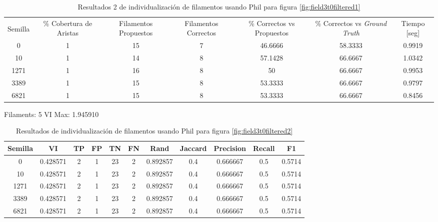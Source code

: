 \begin{table}[h]
    \centering
    \begin{tabular}{|c|c|c|c|c|c|c|}
    \hline
         & \multirow{4}{2cm}{\centering \% Cobertura de Aristas} & \multirow{4}{2cm}{Filamentos Propuestos} & \multirow{4}{2cm}{Filamentos Correctos} & \multirow{4}{2.5cm}{\% Correctos vs Propuestos} & \multirow{4}{2.5cm}{\centering \% Correctos vs {\it Ground Truth}} & \multirow{4}{1.2cm}{\centering Tiempo [seg]} \\
         &  &  &  & & &  \\
        Semilla &  &  &  & & &  \\
        &  &  &  & & &  \\ \hline 
        0 & 1 & 15 & 7 & 46.6666 & 58.3333 & 0.9919  \\
        10 & 1 & 14 & 8 & 57.1428 & 66.6667 & 1.0342\\
        1271 & 1 & 16 & 8 & 50  & 66.6667 & 0.9953\\
        3389 & 1 & 15 & 8 & 53.3333 & 66.6667 & 0.9797\\
        6821 & 1 & 15 & 8 & 53.3333 & 66.6667 & 0.8456\\
        \hline
    \end{tabular}
    \caption{Resultados 2 de individualizaci\'on de filamentos usando Phil para figura \ref{fig:field3t0filtered1}}
    \label{tab:field3t0filtered1Results2}
\end{table}

Filaments: 5	VI Max: 1.945910
\begin{table}[h]
    \centering
    \begin{tabular}{|c|c|c|c|c|c|c|c|c|c|c|}
    \hline
        Semilla & VI & TP & FP &TN &FN & Rand	& Jaccard &	Precision &	Recall &	F1 \\ \hline 
        0    & 0.428571 & 2 & 1 & 23 & 2 & 0.892857 & 0.4 & 0.666667 & 0.5 & 0.5714 \\
        10   & 0.428571 & 2 & 1 & 23 & 2 & 0.892857 & 0.4 & 0.666667 & 0.5 & 0.5714 \\
        1271 & 0.428571 & 2 & 1 & 23 & 2 & 0.892857 & 0.4 & 0.666667 & 0.5 & 0.5714 \\
        3389 & 0.428571 & 2 & 1 & 23 & 2 & 0.892857 & 0.4 & 0.666667 & 0.5 & 0.5714 \\
        6821 & 0.428571 & 2 & 1 & 23 & 2 & 0.892857 & 0.4 & 0.666667 & 0.5 & 0.5714 \\
        \hline
    \end{tabular}
    \caption{Resultados de individualizaci\'on de filamentos usando Phil para figura \ref{fig:field3t0filtered2}}
    \label{tab:field3t0filtered2Results1}
\end{table}


